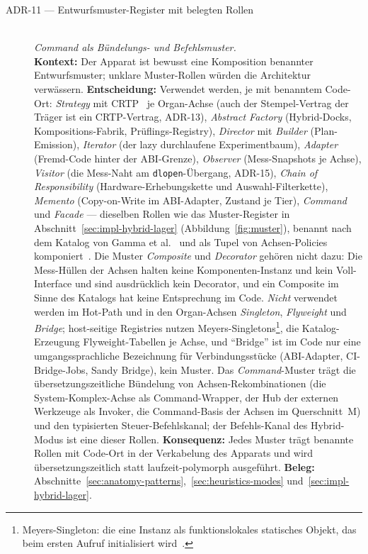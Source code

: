 \begin{description}
  \item[ADR-11 --- Entwurfsmuster-Register mit belegten Rollen]\hfill\\
  \emph{Command als Bündelungs- und Befehlsmuster.}\hfill\\
  \textbf{Kontext:} Der Apparat ist bewusst eine Komposition benannter Entwurfsmuster; unklare
  Muster-Rollen würden die Architektur verwässern.
  \textbf{Entscheidung:} Verwendet werden, je mit benanntem Code-Ort: \emph{Strategy} mit
  CRTP~\cite{coplien1995crtp} je Organ-Achse (auch der Stempel-Vertrag der Träger ist ein
  CRTP-Vertrag, ADR-13), \emph{Abstract Factory} (Hybrid-Docks, Kompositions-Fabrik,
  Prüflings-Registry), \emph{Director} mit \emph{Builder} (Plan-Emission), \emph{Iterator} (der
  lazy durchlaufene Experimentbaum), \emph{Adapter} (Fremd-Code hinter der ABI-Grenze),
  \emph{Observer} (Mess-Snapshots je Achse), \emph{Visitor} (die Mess-Naht am
  \texttt{dlopen}-Übergang, ADR-15), \emph{Chain of Responsibility} (Hardware-Erhebungskette und
  Auswahl-Filterkette), \emph{Memento} (Copy-on-Write im ABI-Adapter, Zustand je Tier),
  \emph{Command} und \emph{Facade} --- dieselben Rollen wie das Muster-Register in
  Abschnitt~\ref{sec:impl-hybrid-lager} (Abbildung~\ref{fig:muster}), benannt nach dem Katalog von
  Gamma et al.~\cite{gamma1994patterns} und als Tupel von Achsen-Policies
  komponiert~\cite{alexandrescu2001modern}. Die Muster \emph{Composite} und \emph{Decorator} gehören nicht dazu:
  Die Mess-Hüllen der Achsen halten keine Komponenten-Instanz und kein Voll-Interface und sind
  ausdrücklich kein Decorator, und ein Composite im Sinne des Katalogs hat keine Entsprechung im Code.
  \emph{Nicht} verwendet werden im Hot-Path und in den Organ-Achsen \emph{Singleton}, \emph{Flyweight}
  und \emph{Bridge}; host-seitige Registries nutzen Meyers-Singletons\footnote{Meyers-Singleton: die
  eine Instanz als funktionslokales statisches Objekt, das beim ersten Aufruf initialisiert
  wird~\cite{meyers2005effective}.}, die Katalog-Erzeugung Flyweight-Tabellen je Achse, und
  \enquote{Bridge} ist im Code nur eine umgangssprachliche Bezeichnung für Verbindungsstücke
  (ABI-Adapter, CI-Bridge-Jobs, Sandy Bridge), kein Muster. Das \emph{Command}-Muster
  trägt die übersetzungszeitliche Bündelung von Achsen-Rekombinationen (die System-Komplex-Achse als
  Command-Wrapper, der Hub der externen Werkzeuge als Invoker, die Command-Basis der Achsen im
  Querschnitt~M) und den typisierten Steuer-Befehlskanal; der Befehls-Kanal des Hybrid-Modus ist eine
  dieser Rollen.
  \textbf{Konsequenz:} Jedes Muster trägt benannte Rollen mit Code-Ort in der Verkabelung des Apparats
  und wird übersetzungszeitlich statt laufzeit-polymorph ausgeführt.
  \textbf{Beleg:} Abschnitte~\ref{sec:anatomy-patterns},~\ref{sec:heuristics-modes}
  und~\ref{sec:impl-hybrid-lager}.


\end{description}
